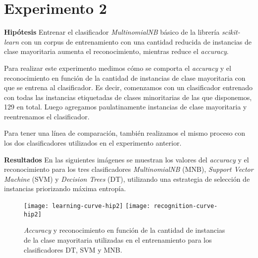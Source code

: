 \section{Experimento 2}
\vspace{3 mm}
\textbf{Hipótesis} Entrenar el clasificador \textit{MultinomialNB} básico de la librería \textit{scikit-learn} con un corpus de entrenamiento con una cantidad reducida de instancias de clase mayoritaria aumenta el reconocimiento, mientras reduce el \textit{accuracy}.
\vspace{3 mm}

Para realizar este experimento medimos cómo se comporta el \textit{accuracy} y el reconocimiento en función de la cantidad de instancias de clase mayoritaria con que se entrena al clasificador. Es decir, comenzamos con un clasificador entrenado con todas las instancias etiquetadas de clases minoritarias de las que disponemos, 129 en total. Luego agregamos paulatinamente instancias de clase mayoritaria y reentrenamos el clasificador.

Para tener una línea de comparación, también realizamos el mismo proceso con los dos clasificadores utilizados en el experimento anterior.

\vspace{3 mm}

\textbf{Resultados} En las siguientes imágenes se muestran los valores del \textit{accuracy} y el reconocimiento para los tres clasificadores \textit{MultinomialNB} (MNB), \textit{Support Vector Machine} (SVM) y \textit{Decision Trees} (DT), utilizando una estrategia de selección de instancias priorizando máxima entropía.

\begin{figure}[h!]
\texttt{[image: learning-curve-hip2]}
\texttt{[image: recognition-curve-hip2]}
\caption{\textit{Accuracy} y reconocimiento en función de la cantidad de instancias de la clase mayoritaria utilizadas en el entrenamiento para los clasificadores DT, SVM y MNB.}\label{curva-apr-hip2}
\centering
\end{figure}

